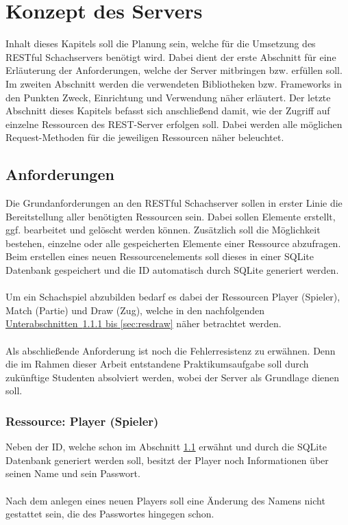 
\chapter{Konzept des Servers}
Inhalt dieses Kapitels soll die Planung sein, welche für die Umsetzung des RESTful Schachservers benötigt wird. Dabei dient der erste Abschnitt für eine Erläuterung der Anforderungen, welche der Server mitbringen bzw. erfüllen soll. Im zweiten Abschnitt werden die verwendeten Bibliotheken bzw. Frameworks in den Punkten Zweck, Einrichtung und Verwendung näher erläutert. Der letzte Abschnitt dieses Kapitels befasst sich anschließend damit, wie der Zugriff auf einzelne Ressourcen des REST-Server erfolgen soll. Dabei werden alle möglichen Request-Methoden für die jeweiligen Ressourcen näher beleuchtet.

\section{Anforderungen}\label{sec:anforderungen}
Die Grundanforderungen an den RESTful Schachserver sollen in erster Linie die Bereitstellung aller benötigten Ressourcen sein. Dabei sollen Elemente erstellt, ggf. bearbeitet und gelöscht werden können. Zusätzlich soll die Möglichkeit bestehen, einzelne oder alle gespeicherten Elemente einer Ressource abzufragen. Beim erstellen eines neuen Ressourcenelements soll dieses in einer SQLite Datenbank gespeichert und die ID automatisch durch SQLite generiert werden.\\
\\
Um ein Schachspiel abzubilden bedarf es dabei der Ressourcen Player (Spieler), Match (Partie) und Draw (Zug), welche in den nachfolgenden \hyperref[sec:resplayer, sec:resdraw]{Unterabschnitten~\ref{sec:resplayer} bis \ref{sec:resdraw}} näher betrachtet werden.\\
\\
Als abschließende Anforderung ist noch die Fehlerresistenz zu erwähnen. Denn die im Rahmen dieser Arbeit entstandene Praktikumsaufgabe  soll durch zukünftige Studenten absolviert werden, wobei der Server als Grundlage dienen soll.

\subsection{Ressource: Player (Spieler)}\label{sec:resplayer}
Neben der ID, welche schon im Abschnitt \ref{sec:anforderungen} erwähnt und durch die SQLite Datenbank generiert werden soll, besitzt der Player noch Informationen über seinen Name und sein Passwort.\\
\\
Nach dem anlegen eines neuen Players soll eine Änderung des Namens nicht gestattet sein, die des Passwortes hingegen schon.

